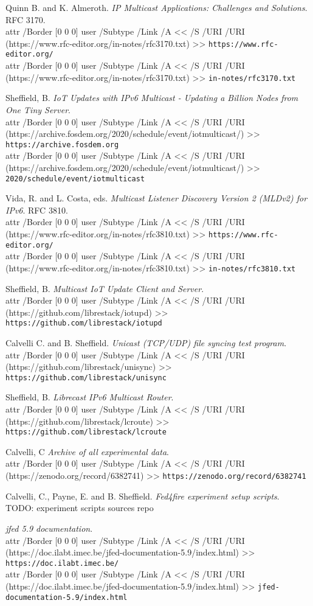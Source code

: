 \documentclass[a4paper,11pt,twocolumn]{article}
\newcommand{\longurl}[2]{%
\pdfstartlink %
attr {/Border [0 0 0]} %
user {/Subtype /Link /A << /S /URI /URI (#1) >>}%
{\footnotesize\tt #2}\pdfendlink}
\newcommand{\url}[1]{\longurl{#1}{#1}}
\newcommand{\url}[1]{{\footnotesize\tt #1}}
\newcommand{\longurl}[2]{{\footnotesize\tt #1}}
\begin{document}

\begin{thebibliography}{99}
\sloppy
{}

  Quinn B. and K. Almeroth.
  {\em IP Multicast Applications: Challenges and Solutions}.
  RFC 3170.\\
  \longurl{https://www.rfc-editor.org/in-notes/rfc3170.txt}%
  {https://www.rfc-editor.org/}\\
  \longurl{https://www.rfc-editor.org/in-notes/rfc3170.txt}%
  {in-notes/rfc3170.txt}

  Sheffield, B.
  {\em IoT Updates with IPv6 Multicast -  Updating a Billion Nodes from One Tiny Server}.\\
    \longurl{https://archive.fosdem.org/2020/schedule/event/iotmulticast/}%
     {https://archive.fosdem.org}\\
    \longurl{https://archive.fosdem.org/2020/schedule/event/iotmulticast/}%
     {2020/schedule/event/iotmulticast}

  Vida, R. and L. Costa, eds.
  {\em Multicast Listener Discovery Version 2 (MLDv2) for IPv6}.
  RFC 3810.\\
  \longurl{https://www.rfc-editor.org/in-notes/rfc3810.txt}%
  {https://www.rfc-editor.org/}\\
  \longurl{https://www.rfc-editor.org/in-notes/rfc3810.txt}%
  {in-notes/rfc3810.txt}

  Sheffield, B.
  {\em Multicast IoT Update Client and Server}.\\
  \url{https://github.com/librestack/iotupd}

  Calvelli C. and B. Sheffield.
  {\em Unicast (TCP/UDP) file syncing test program}.\\
  \url{https://github.com/librestack/unisync}

  Sheffield, B.
  {\em Librecast IPv6 Multicast Router}.\\
  \url{https://github.com/librestack/lcroute}

  Calvelli, C
  {\em Archive of all experimental data}.\\
  \url{https://zenodo.org/record/6382741}

  Calvelli, C., Payne, E. and B. Sheffield.
  {\em Fed4fire experiment setup scripts}.\\
  TODO: experiment scripts sources repo

  {\em jfed 5.9 documentation}.\\
  \longurl{https://doc.ilabt.imec.be/jfed-documentation-5.9/index.html}%
  {https://doc.ilabt.imec.be/}\\
  \longurl{https://doc.ilabt.imec.be/jfed-documentation-5.9/index.html}%
  {jfed-documentation-5.9/index.html}


\end{thebibliography}
\end{document}
